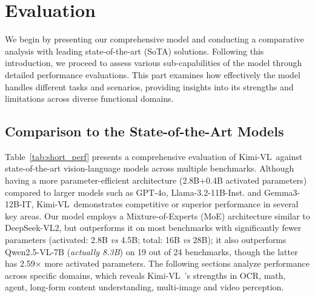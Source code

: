 \documentclass{article}
\newcommand{\ourname}{{Kimi-VL}}
\begin{document}
\section{Evaluation}



We begin by presenting our comprehensive model and conducting a comparative analysis with leading state-of-the-art (SoTA) solutions. Following this introduction, we proceed to assess various sub-capabilities of the model through detailed performance evaluations. This part examines how effectively the model handles different tasks and scenarios, providing insights into its strengths and limitations across diverse functional domains.



\subsection{Comparison to the State-of-the-Art Models}


Table~\ref{tab:short_perf} presents a comprehensive evaluation of \ourname~against state-of-the-art vision-language models across multiple benchmarks. Although having a more parameter-efficient architecture (2.8B+0.4B activated parameters) compared to larger models such as GPT-4o, Llama-3.2-11B-Inst. and Gemma3-12B-IT, \ourname~demonstrates competitive or superior performance in several key areas. Our model employs a Mixture-of-Experts (MoE) architecture similar to DeepSeek-VL2, but outperforms it on most benchmarks with significantly fewer parameters (activated: 2.8B \textit{vs} 4.5B; total: 16B \textit{vs} 28B); it also outperforms Qwen2.5-VL-7B (\textit{actually 8.3B}) on 19 out of 24 benchmarks, though the latter has 2.59$\times$ more activated parameters. The following sections analyze performance across specific domains, which reveals \ourname~'s strengths in OCR, math, agent, long-form content understanding, multi-image and video perception.
\end{document}
